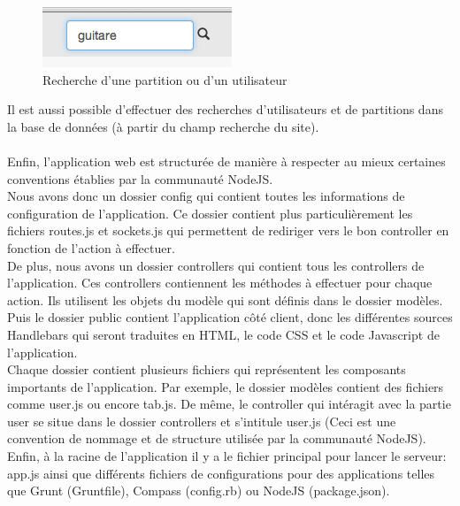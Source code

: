 \begin{figure}[H]
\centering
\includegraphics[scale=1]{rechercheWeb}
\caption{Recherche d'une partition ou d'un utilisateur}
\end{figure}

Il est aussi possible d'effectuer des recherches d'utilisateurs et de partitions dans la base de données (à partir du champ recherche du site).
\paragraph{}
Enfin, l'application web est structurée de manière à respecter au mieux certaines conventions établies par la communauté NodeJS. \\
Nous avons donc un dossier config qui contient toutes les informations de configuration de l'application. Ce dossier contient plus particulièrement les fichiers routes.js et sockets.js qui permettent de rediriger vers le bon controller en fonction de l'action à effectuer. \\
De plus, nous avons un dossier controllers qui contient tous les controllers de l'application. Ces controllers contiennent les méthodes à effectuer pour chaque action. Ils utilisent les objets du modèle qui sont définis dans le dossier modèles. \\
Puis le dossier public contient l'application côté client, donc les différentes sources Handlebars qui seront traduites en HTML, le code CSS et le code Javascript de l'application. \\
Chaque dossier contient plusieurs fichiers qui représentent les composants importants de l'application. Par exemple, le dossier modèles contient des fichiers comme user.js ou encore tab.js. De même, le controller qui intéragit avec la partie user se situe dans le dossier controllers et s'intitule user.js (Ceci est une convention de nommage et de structure utilisée par la communauté NodeJS). \\
Enfin, à la racine de l'application il y a le fichier principal pour lancer le serveur: app.js ainsi que différents fichiers de configurations pour des applications telles que Grunt (Gruntfile), Compass (config.rb) ou NodeJS (package.json). \\

